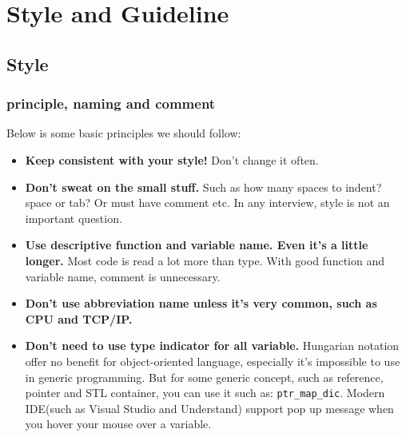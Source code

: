 \documentclass[a4paper,11pt,twoside]{book}
\begin{document}
\chapter{Style and Guideline}


\section{Style}
\subsection{principle, naming and comment}
Below is some basic principles we should follow:
\begin{itemize}
	\item \textbf{Keep consistent with your style!} Don't change it often.
	
	\item \textbf{Don't sweat on the small stuff.} Such as how many spaces to indent? space or tab? Or must have comment etc. In any interview, style is not an important question.
	
	\item \textbf{Use descriptive function and variable name. Even it's a little longer.} Most code is read a lot more than type. With good function and variable name, comment is unnecessary.
	
	\item \textbf{Don't use abbreviation name unless it's very common, such as CPU and TCP/IP.}
	
	\item \textbf{Don't need to use type indicator for all variable.} Hungarian notation offer no benefit for object-oriented language, especially it's impossible to use in generic programming. But for some generic concept, such as reference, pointer and STL container, you can use it such as: \texttt{ptr\_map\_dic}. Modern IDE(such as Visual Studio and Understand) support pop up message when you hover your mouse over a variable.
\end{itemize}
\end{document}
